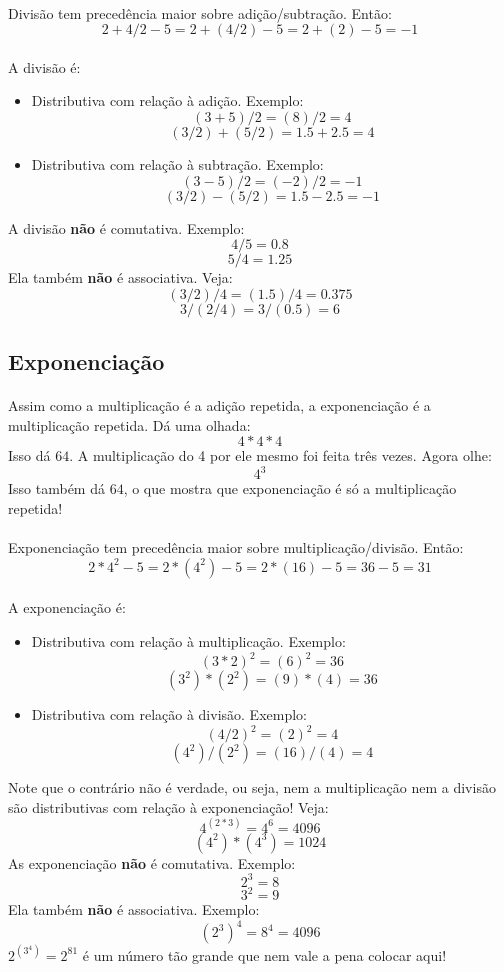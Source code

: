\documentclass{article}
\begin{document}
\paragraph{}
Divisão tem precedência maior sobre adição/subtração. Então:
$$2 + 4/2 - 5 = 2 + (4/2) - 5 = 2 + (2) - 5 = -1$$
\paragraph{}
A divisão é:
\begin{itemize}
\item Distributiva com relação à adição. Exemplo:
$$(3 + 5)/2 = (8)/2 = 4$$
$$(3/2) + (5/2) = 1.5 + 2.5 = 4$$
\item Distributiva com relação à subtração. Exemplo:
$$(3 - 5)/2 = (-2)/2 = -1$$
$$(3/2) - (5/2) = 1.5 - 2.5 = -1$$
\end{itemize}
A divisão \textbf{não} é comutativa. Exemplo:
$$4 / 5 = 0.8$$
$$5 / 4 = 1.25$$
Ela também \textbf{não} é associativa. Veja:
$$(3 / 2) / 4 = (1.5)/4 = 0.375$$
$$3 / (2 / 4) = 3 / (0.5) = 6$$

\subsection{Exponenciação}
\paragraph{}
Assim como a multiplicação é a adição repetida, a exponenciação é a 
multiplicação repetida. Dá uma olhada:
$$4 * 4 * 4$$
Isso dá $64$. A multiplicação do 4 por ele mesmo foi feita três vezes. 
Agora olhe:
$$4^3$$
Isso também dá $64$, o que mostra que exponenciação é só a multiplicação
repetida!
\paragraph{}
Exponenciação tem precedência maior sobre multiplicação/divisão. Então:
$$2 * 4^2 - 5 = 2 * (4^2) - 5 = 2 * (16) - 5 = 36 - 5 = 31$$
\paragraph{}
A exponenciação é:
\begin{itemize}
\item Distributiva com relação à multiplicação. Exemplo:
$${(3*2)}^2 = {(6)}^2 = 36$$
$$(3^2)*(2^2) = (9)*(4) = 36$$
\item Distributiva com relação à divisão. Exemplo:
$${(4/2)}^2 = {(2)}^2 = 4$$
$$(4^2)/(2^2) = (16)/(4) = 4$$
\end{itemize}
Note que o contrário não é verdade, ou seja, nem a multiplicação nem a 
divisão são distributivas com relação à exponenciação! Veja:
$$4^{(2*3)} = 4^6 = 4096$$
$$(4^2)*(4^3) = 1024$$
As exponenciação \textbf{não} é comutativa. Exemplo:
$$2^3 = 8$$
$$3^2 = 9$$
Ela também \textbf{não} é associativa. Exemplo:
$${(2^3)}^4 = 8^4 = 4096$$
$2^{(3^4)} = 2^{81}$ é um número tão grande que nem vale a pena colocar aqui!
\end{document}

